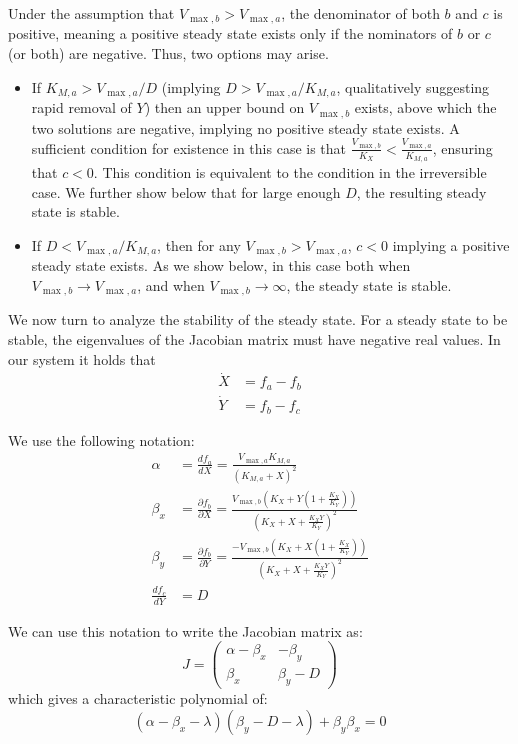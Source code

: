 Under the assumption that $V_{\max,b}>V_{\max,a}$, the denominator of both $b$ and $c$ is positive, meaning a positive steady state exists only if the nominators of $b$ or $c$ (or both) are negative.
Thus, two options may arise.
\begin{itemize}
    \item If $K_{M,a}>V_{\max,a}/D$ (implying $D>V_{\max,a}/K_{M,a}$, qualitatively suggesting rapid removal of $Y$) then an upper bound on $V_{\max,b}$ exists, above which the two solutions are negative, implying no positive steady state exists.
    A sufficient condition for existence in this case is that $\frac{V_{\max,b}}{K_X}<\frac{V_{\max,a}}{K_{M,a}}$, ensuring that $c<0$.
    This condition is equivalent to the condition in the irreversible case.
    We further show below that for large enough $D$, the resulting steady state is stable.
    \item If $D<V_{\max,a}/K_{M,a}$, then for any $V_{\max,b}>V_{\max,a}$, $c<0$ implying a positive steady state exists.
    As we show below, in this case both when $V_{\max,b}\rightarrow V_{\max,a}$, and when $V_{\max,b}\rightarrow \infty$, the steady state is stable.
\end{itemize}

We now turn to analyze the stability of the steady state.
For a steady state to be stable, the eigenvalues of the Jacobian matrix must have negative real values.
In our system it holds that
\begin{align*}
    \dot{X} & =f_a-f_b \\
    \dot{Y} & =f_b-f_c
\end{align*}

We use the following notation:
\begin{align*}
  \alpha & =\frac{df_a}{dX}=\frac{V_{\max,a}K_{M,a}}{(K_{M,a}+X)^2} \\
  \beta_x & =\frac{\partial f_b}{\partial X}= \frac{V_{\max,b}(K_X+Y(1+\frac{K_X}{K_Y}))}{(K_X+X+\frac{K_XY}{K_Y})^2}
\\
  \beta_y & =\frac{\partial f_b}{\partial Y}= \frac{-V_{\max,b}(K_X+X(1+\frac{K_X}{K_Y}))}{(K_X+X+\frac{K_XY}{K_Y})^2} \\
  \frac{df_c}{dY}&=D
\end{align*}

We can use this notation to write the Jacobian matrix as:
   \begin{equation*}
        J=
        \begin{pmatrix}
            \alpha-\beta_x & -\beta_y \\
            \beta_x & \beta_y-D
        \end{pmatrix}
    \end{equation*}
which gives a characteristic polynomial of:
\begin{equation*}
    (\alpha-\beta_x-\lambda)(\beta_y-D-\lambda)+\beta_y\beta_x=0
\end{equation*}

